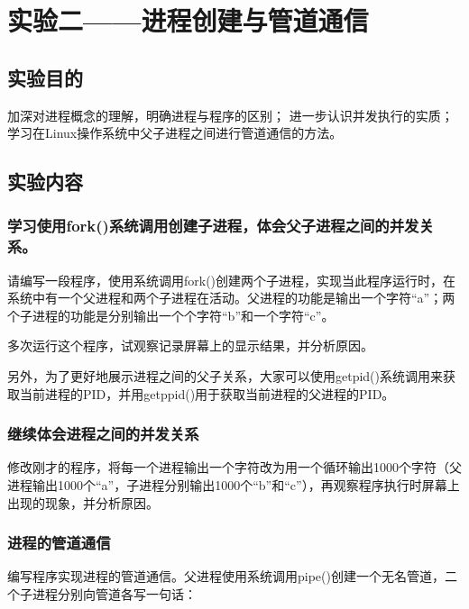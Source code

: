 \documentclass{ctexrep}
\begin{document}


\tableofcontents
\clearpage

\chapter{实验二——进程创建与管道通信}
\section{实验目的}

\begin{outline}[cenumerate]
    \1 加深对进程概念的理解，明确进程与程序的区别；
    \1 进一步认识并发执行的实质；
    \1 学习在Linux操作系统中父子进程之间进行管道通信的方法。
\end{outline}

\section{实验内容}

\subsection{学习使用fork()系统调用创建子进程，体会父子进程之间的并发关系。}

请编写一段程序，使用系统调用fork()创建两个子进程，实现当此程序运行时，在系统中有一个父进程和两个子进程在活动。父进程的功能是输出一个字符“a”；两个子进程的功能是分别输出一个个字符“b”和一个字符“c”。

多次运行这个程序，试观察记录屏幕上的显示结果，并分析原因。

另外，为了更好地展示进程之间的父子关系，大家可以使用getpid()系统调用来获取当前进程的PID，并用getppid()用于获取当前进程的父进程的PID。

\subsection{继续体会进程之间的并发关系}

修改刚才的程序，将每一个进程输出一个字符改为用一个循环输出1000个字符（父进程输出1000个“a”，子进程分别输出1000个“b”和“c”），再观察程序执行时屏幕上出现的现象，并分析原因。

\subsection{进程的管道通信}

编写程序实现进程的管道通信。父进程使用系统调用pipe()创建一个无名管道，二个子进程分别向管道各写一句话：
\end{document}

